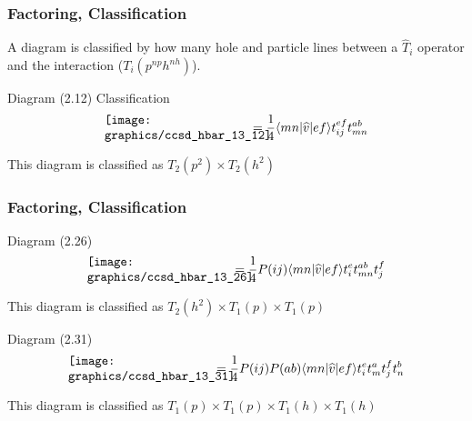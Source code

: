 \begin{frame}
    \frametitle{Factoring, Classification}

A diagram is classified by how many hole and particle lines between a $\hat{T}_i$ operator and the interaction ($T_i(p^{np} h^{nh})$).
\begin{block}{Diagram (2.12) Classification}
    \begin{equation*}
        \parbox{40mm}{\texttt{[image: graphics/ccsd\_hbar\_13\_12]}}
        = \frac{1}{4}  \bra{mn}\op{v}\ket{ef} t_{ij}^{ef} t_{mn}^{ab}
    \end{equation*}
\end{block}
This diagram is classified as $T_2(p^2) \times T_2(h^2)$
\end{frame}

\begin{frame}
    \frametitle{Factoring, Classification}

\begin{block}{Diagram (2.26)} 
    \begin{equation*}
        \parbox{40mm}{\texttt{[image: graphics/ccsd\_hbar\_13\_26]}}
        = \frac{1}{4} P(ij) \bra{mn}\op{v}\ket{ef} t_i^e t_{mn}^{ab} t_j^f
    \end{equation*}
\end{block}
This diagram is classified as $T_2(h^2) \times T_1(p) \times T_1(p)$
\begin{block}{Diagram (2.31)} 
    \begin{equation*}
        \parbox{40mm}{\texttt{[image: graphics/ccsd\_hbar\_13\_31]}}
        = \frac{1}{4} P(ij) P(ab) \bra{mn}\op{v}\ket{ef} t_i^e t_m^a t_j^f t_n^b
    \end{equation*}
\end{block}
This diagram is classified as $T_1(p) \times T_1(p) \times T_1(h) \times T_1(h)$
\end{frame}

